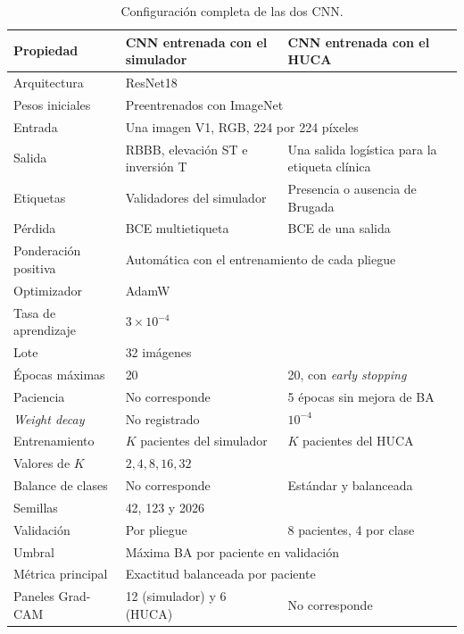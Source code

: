 \begin{table}[H]
  \centering
  \small
  \begin{tabularx}{\textwidth}{p{3.5cm}XX}
    \toprule
    Propiedad & CNN entrenada con el simulador & CNN entrenada con el HUCA \\
    \midrule
    Arquitectura & \multicolumn{2}{l}{ResNet18} \\
    Pesos iniciales & \multicolumn{2}{l}{Preentrenados con ImageNet} \\
    Entrada & \multicolumn{2}{l}{Una imagen V1, RGB, 224 por 224 píxeles} \\
    Salida & RBBB, elevación ST e inversión T & Una salida logística para la etiqueta clínica \\
    Etiquetas & Validadores del simulador & Presencia o ausencia de Brugada \\
    Pérdida & BCE multietiqueta & BCE de una salida \\
    Ponderación positiva & \multicolumn{2}{l}{Automática con el entrenamiento de cada pliegue} \\
    Optimizador & \multicolumn{2}{l}{AdamW} \\
    Tasa de aprendizaje & \multicolumn{2}{l}{\(3\times10^{-4}\)} \\
    Lote & \multicolumn{2}{l}{32 imágenes} \\
    Épocas máximas & 20 & 20, con \textit{early stopping} \\
    Paciencia & No corresponde & 5 épocas sin mejora de BA \\
    \textit{Weight decay} & No registrado & \(10^{-4}\) \\
    Entrenamiento & \(K\) pacientes del simulador & \(K\) pacientes del HUCA \\
    Valores de \(K\) & \multicolumn{2}{l}{\(2,4,8,16,32\)} \\
    Balance de clases & No corresponde & Estándar y balanceada \\
    Semillas & \multicolumn{2}{l}{42, 123 y 2026} \\
    Validación & Por pliegue & 8 pacientes, 4 por clase \\
    Umbral & \multicolumn{2}{l}{Máxima BA por paciente en validación} \\
    Métrica principal & \multicolumn{2}{l}{Exactitud balanceada por paciente} \\
    Paneles Grad-CAM & 12 (simulador) y 6 (HUCA) & No corresponde \\
    \bottomrule
  \end{tabularx}
  \caption{Configuración completa de las dos CNN.}
  \label{tab:config_cnn_appendix}
  \label{tab:config_cnn_clinical_appendix}
  \label{tab:modelo_cnn_final}
  \label{tab:modelo_cnn_clinica}
\end{table}

